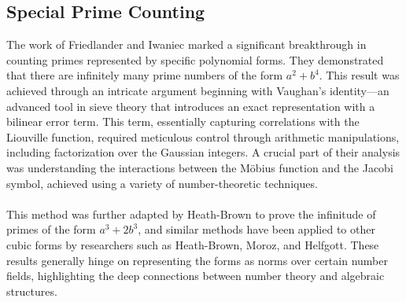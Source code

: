 \documentclass[10pt]{extarticle}
\begin{document}
\subsection{Special Prime Counting}
The work of Friedlander and Iwaniec marked a significant breakthrough in counting primes represented by specific polynomial forms. They demonstrated that there are infinitely many prime numbers of the form $a^2 + b^4$. 
This result was achieved through an intricate argument beginning with Vaughan’s identity—an advanced tool in sieve theory that introduces an exact representation with a bilinear error term. This term, essentially capturing correlations with the Liouville function, required meticulous control through arithmetic manipulations, including factorization over the Gaussian integers. A crucial part of their analysis was understanding the interactions between the Möbius function and the Jacobi symbol, achieved using a variety of number-theoretic techniques.\\
\\
This method was further adapted by Heath-Brown to prove the infinitude of primes of the form $a^3 + 2b^3$, and similar methods have been applied to other cubic forms by researchers such as Heath-Brown, Moroz, and Helfgott. These results generally hinge on representing the forms as norms over certain number fields, highlighting the deep connections between number theory and algebraic structures.
\end{document}
